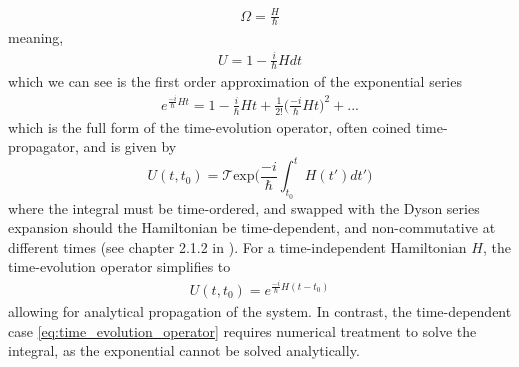 \documentclass{subfiles}
\begin{document}
\begin{align*}
    \Omega = \frac{H}{\hbar}
\end{align*}
meaning, 
\begin{align*}
    U = 1 - \frac{i}{\hbar}Hdt
\end{align*}
which we can see is the first order approximation of the exponential series
\begin{align*}
    e^{\frac{-i}{\hbar}Ht} = 1 - \frac{i}{\hbar}Ht + \frac{1}{2!}\bigg(\frac{-i}{\hbar}Ht\bigg)^2 + ...
\end{align*}
which is the full form of the time-evolution operator, often coined time-propagator, and is given by
\begin{equation}
    U(t, t_0) = \mathcal{T}\text{exp}\bigg(\frac{-i}{\hbar}\int_{t_0}^t H(t')dt'\bigg)\label{eq:time_evolution_operator}
\end{equation}
where the integral must be time-ordered, and swapped with the Dyson series expansion should the Hamiltonian be time-dependent, and non-commutative at different times (see chapter 2.1.2 in \cite{sakurai1986modern}). For a time-independent Hamiltonian $H$, the time-evolution operator simplifies to 
\begin{align*}
    U(t, t_0) = e^{\frac{-i}{\hbar}H(t-t_0)}
\end{align*}
allowing for analytical propagation of the system. In contrast, the time-dependent case \eqref{eq:time_evolution_operator} requires numerical treatment to solve the integral, as the exponential cannot be solved analytically. 
\end{document}
